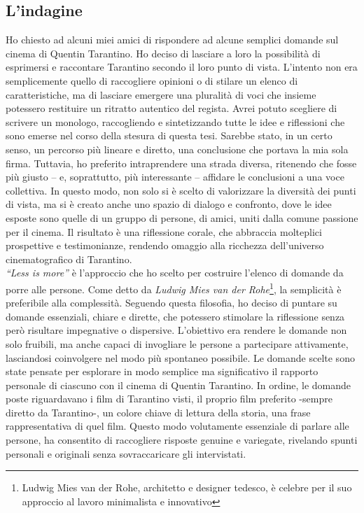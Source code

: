 \documentclass[12pt]{article} %
\begin{document}
\subsection{L'indagine}
    \begin{flushleft}
        Ho chiesto ad alcuni miei amici di rispondere ad alcune semplici domande sul cinema di Quentin Tarantino. Ho deciso di lasciare a loro la possibilità di esprimersi e raccontare Tarantino secondo il loro punto di vista.
        L'intento non era semplicemente quello di raccogliere opinioni o di stilare un elenco di caratteristiche, ma di lasciare emergere una pluralità di voci che insieme potessero restituire un ritratto autentico del regista.
        Avrei potuto scegliere di scrivere un monologo, raccogliendo e sintetizzando tutte le idee e riflessioni che sono emerse nel corso della stesura di questa tesi. Sarebbe stato, in un certo senso, un percorso più lineare e diretto, una conclusione che portava la mia sola firma. Tuttavia, ho preferito intraprendere una strada diversa, ritenendo che fosse più giusto – e, soprattutto, più interessante – affidare le conclusioni a una voce collettiva.
        In questo modo, non solo si è scelto di valorizzare la diversità dei punti di vista, ma si è creato anche uno spazio di dialogo e confronto, dove le idee esposte sono quelle di un gruppo di persone, di amici, uniti dalla comune passione per il cinema. Il risultato è una riflessione corale, che abbraccia molteplici prospettive e testimonianze, rendendo omaggio alla ricchezza dell'universo cinematografico di Tarantino.
        \\\vspace{1cm}
        \textit{``Less is more''} è l'approccio che ho scelto per costruire l'elenco di domande da porre alle persone. Come detto da \textit{Ludwig Mies van der Rohe}\footnote{Ludwig Mies van der Rohe, architetto e designer tedesco, è celebre per il suo approccio al lavoro minimalista e innovativo}, la semplicità è preferibile alla complessità. Seguendo questa filosofia, ho deciso di puntare su domande essenziali, chiare e dirette, che potessero stimolare la riflessione senza però risultare impegnative o dispersive. L’obiettivo era rendere le domande non solo fruibili, ma anche capaci di invogliare le persone a partecipare attivamente, lasciandosi coinvolgere nel modo più spontaneo possibile. Le domande scelte sono state pensate per esplorare in modo semplice ma significativo il rapporto personale di ciascuno con il cinema di Quentin Tarantino.
        In ordine, le domande poste riguardavano i film di Tarantino visti, il proprio film preferito -sempre diretto da Tarantino-, un colore chiave di lettura della storia, una frase rappresentativa di quel film.
        Questo modo volutamente essenziale di parlare alle persone, ha consentito di raccogliere risposte genuine e variegate, rivelando spunti personali e originali senza sovraccaricare gli intervistati. 
    \end{flushleft}
\end{document}
